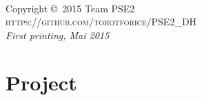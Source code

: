 \documentclass[11pt,fleqn,openany]{book} %
\begin{document}

\newpage
~\vfill
\thispagestyle{empty}

\noindent Copyright \copyright\ 2015 Team PSE2\\ %


\noindent \textsc{https://github.com/tohotforice/PSE2\_DH}\\ %


\noindent \textit{First printing, Mai 2015} %



\pagestyle{empty} %

\tableofcontents %

\cleardoublepage %

\pagestyle{fancy} %


\part{Project}
\end{document}
